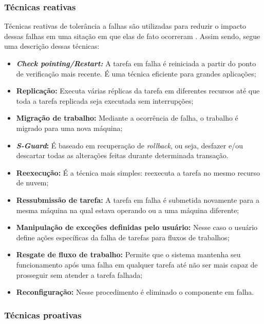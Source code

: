 \documentclass[
	12pt,				%
	oneside,			%
	a4paper,			%
	chapter=TITLE,		%
	english,			%
	french,				%
	spanish,			%
	brazil				%
	]{abntex2}
\begin{document}
\subsubsection{Técnicas reativas}

Técnicas reativas de tolerância a falhas são utilizadas para reduzir o impacto dessas falhas em uma sitação em que elas de fato ocorreram \cite{bala2012fault, patra2013fault}. Assim sendo, segue uma descrição dessas técnicas:

\begin{itemize}
    \item \textbf{\emph{Check pointing/Restart:}} A tarefa em falha é reiniciada a partir do ponto de verificação mais recente. É uma técnica eficiente para grandes aplicações;
    \item \textbf{Replicação:} Executa várias réplicas da tarefa em diferentes recursos até que toda a tarefa replicada seja executada sem interrupções;
    \item \textbf{Migração de trabalho:} Mediante a ocorrência de falha, o trabalho é migrado para uma nova máquina;
    \item \textbf{\emph{S-Guard}:} É baseado em recuperação de \emph{rollback}, ou seja, desfazer e/ou descartar todas as alterações feitas durante determinada transação.
    \item \textbf{Reexecução:} É a técnica mais simples: reexecuta a tarefa no mesmo recurso de nuvem;
    \item \textbf{Ressubmissão de tarefa:} A tarefa em falha é submetida novamente para a mesma máquina na qual estava operando ou a uma máquina diferente;
    \item \textbf{Manipulação de exceções definidas pelo usuário:} Nesse caso o usuário define ações específicas da falha de tarefas para fluxos de trabalhos;
    \item \textbf{Resgate de fluxo de trabalho:} Permite que o sistema mantenha seu funcionamento após uma falha em qualquer tarefa até não ser mais capaz de prosseguir sem atender a tarefa falhada;
    \item \textbf{Reconfiguração:} Nesse procedimento é eliminado o componente em falha.
\end{itemize}

\subsubsection{Técnicas proativas}
\end{document}
